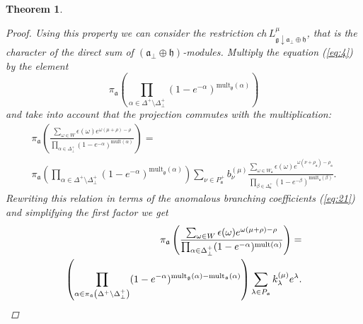 \documentclass[12pt]{iopart}
\newtheorem{theorem}{Theorem}
\theoremstyle{definition}
\theoremstyle{definition}
\theoremstyle{definition}
\begin{document}
\begin{theorem}
\begin{proof}
    Using this property we can consider the restriction
    $ch\, L^{\mu}_{\mathfrak{g}\downarrow \mathfrak{a}_{\bot}\oplus \mathfrak{h}}$,
    that is the character of the direct sum of $\left( \mathfrak{a}_{\bot}\oplus\mathfrak{h}\right) $-modules.
    Multiply the equation (\ref{eq:4}) by the element
    \begin{equation*}
      \pi_{\mathfrak{a}}\left(\prod_{\alpha\in \Delta^{+}\setminus \Delta^{+}_{\bot}}
        (1-e^{-\alpha})^{\mathrm{mult}_{\mathfrak{g}}(\alpha)} \right)
    \end{equation*}
    and take into account that the projection commutes with the multiplication:
    \begin{eqnarray*}
      \label{eq:7}
      \pi_{\mathfrak{a}}\left(\frac{\sum_{\omega\in W} \epsilon(\omega) e^{\omega(\mu+\rho)-\rho}}{\prod_{\alpha\in\Delta^{+}_{\bot}}(1-e^{-\alpha})^{\mathrm{mult}(\alpha)}}\right) = \\
      \pi_{\mathfrak{a}}\left(\prod_{\alpha\in \Delta^{+}\setminus \Delta^{+}_{\bot}}(1-e^{-\alpha})^{\mathrm{mult}_{\mathfrak{g}}(\alpha)} \right)\sum_{\nu\in P^{+}_{\mathfrak{a}}}b^{(\mu)}_{\nu}
      \frac{\sum_{\omega\in W_{\mathfrak{a}}}\epsilon(\omega)e^{\omega(\nu+\rho_{\mathfrak{a}})-\rho_{\mathfrak{a}}}}{\prod_{\beta\in \Delta_{\mathfrak{a}}^{+}}(1-e^{-\beta})^{\mathrm{mult}_{\mathfrak{a}}(\beta)}}.
    \end{eqnarray*}
    Rewriting this relation in terms of the anomalous branching coefficients (\ref{eq:21}) and simplifying the first factor we get
    \begin{eqnarray*}
      \label{eq:12}
      \pi_{\mathfrak{a}}\left(\frac{\sum_{\omega\in W} \epsilon(\omega) e^{\omega(\mu+\rho)-\rho}}{\prod_{\alpha\in\Delta^{+}_{\bot}}(1-e^{-\alpha})^{\mathrm{mult}(\alpha)}}\right) = \\
      \left(\prod_{\alpha\in \pi_{\mathfrak{a}}\left(\Delta^{+}\setminus \Delta^{+}_{\bot}\right)}(1-e^{-\alpha})^{{\rm mult}_{\mathfrak{g}}(\alpha)-{\rm mult}_{\mathfrak{a}}(\alpha)} \right)
      \sum_{\lambda \in P_{\frak{a}}}k_{\lambda}^{\left( \mu \right) }e^{\lambda }.
    \end{eqnarray*}


\end{proof}
\end{theorem}
\end{document}
